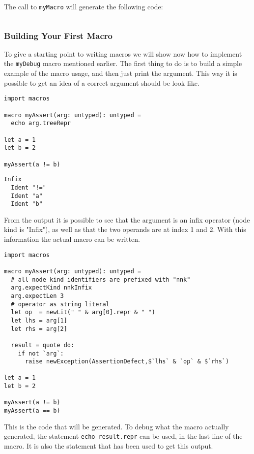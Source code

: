 The call to \texttt{myMacro} will generate the following code:

\begin{verbatim}
\end{verbatim}

\hypertarget{building-your-first-macro}{%
\subsubsection{Building Your First
Macro}\label{building-your-first-macro}}

To give a starting point to writing macros we will show now how to
implement the \texttt{myDebug} macro mentioned earlier. The first thing
to do is to build a simple example of the macro usage, and then just
print the argument. This way it is possible to get an idea of a correct
argument should be look like.

\begin{verbatim}
import macros

macro myAssert(arg: untyped): untyped =
  echo arg.treeRepr

let a = 1
let b = 2

myAssert(a != b)
\end{verbatim}

\begin{verbatim}
Infix
  Ident "!="
  Ident "a"
  Ident "b"
\end{verbatim}

From the output it is possible to see that the argument is an infix
operator (node kind is "Infix"), as well as that the two operands are at
index 1 and 2. With this information the actual macro can be written.

\begin{verbatim}
import macros

macro myAssert(arg: untyped): untyped =
  # all node kind identifiers are prefixed with "nnk"
  arg.expectKind nnkInfix
  arg.expectLen 3
  # operator as string literal
  let op  = newLit(" " & arg[0].repr & " ")
  let lhs = arg[1]
  let rhs = arg[2]

  result = quote do:
    if not `arg`:
      raise newException(AssertionDefect,$`lhs` & `op` & $`rhs`)

let a = 1
let b = 2

myAssert(a != b)
myAssert(a == b)
\end{verbatim}

This is the code that will be generated. To debug what the macro
actually generated, the statement \texttt{echo\ result.repr} can be
used, in the last line of the macro. It is also the statement that has
been used to get this output.

